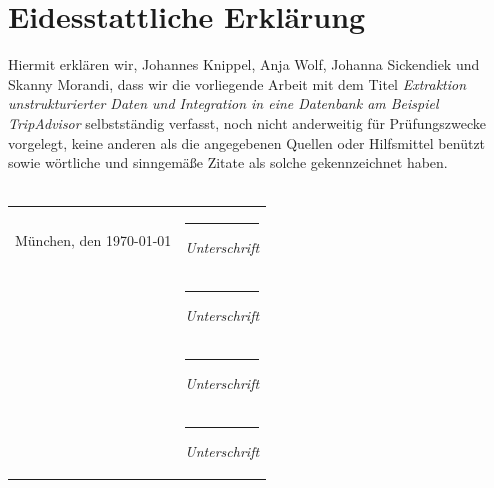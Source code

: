 \documentclass[a4paper,oneside,12pt]{report}
\begin{document}
	
	
	\newpage
	\chapter*{Eidesstattliche Erklärung}
		Hiermit erklären wir, Johannes Knippel, Anja Wolf, Johanna Sickendiek und Skanny Morandi, dass wir die vorliegende Arbeit mit dem Titel \textit{Extraktion unstrukturierter Daten und Integration in eine Datenbank am Beispiel TripAdvisor} selbstständig verfasst, noch nicht anderweitig für Prüfungszwecke vorgelegt, keine anderen als die angegebenen Quellen oder Hilfsmittel benützt sowie wörtliche und sinngemäße Zitate als solche gekennzeichnet haben.
		\vspace{15mm}
		\\
		\\
		\begin{flushleft}
			\begin{tabular}[H]{ll}
				
				München, den \parbox{5,5cm}{\today}  	& 	\parbox{6cm}{\hrule\medskip \textit{Unterschrift}}\\[2cm]
													  	& 	\parbox{6cm}{\hrule\medskip \textit{Unterschrift}}\\[2cm]
													  	& 	\parbox{6cm}{\hrule\medskip \textit{Unterschrift}}\\[2cm]
													  	& 	\parbox{6cm}{\hrule\medskip \textit{Unterschrift}}\\[2cm]
			\end{tabular}
		\end{flushleft}
\end{document}
